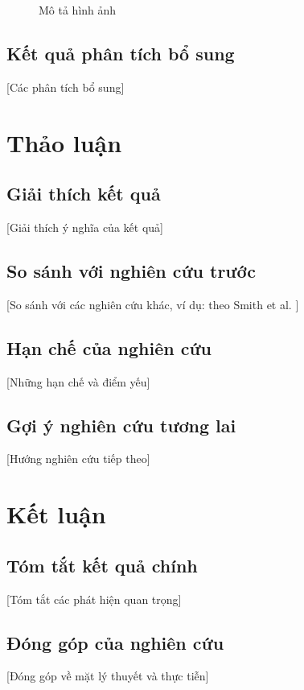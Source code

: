 \documentclass[12pt,a4paper]{article}
\begin{document}
\begin{figure}[h]
\centering
\caption{Mô tả hình ảnh}
\label{fig:example}
\end{figure}

\subsection{Kết quả phân tích bổ sung}
[Các phân tích bổ sung]

\section{Thảo luận}

\subsection{Giải thích kết quả}
[Giải thích ý nghĩa của kết quả]

\subsection{So sánh với nghiên cứu trước}
[So sánh với các nghiên cứu khác, ví dụ: theo Smith et al. \cite{smith2023}]

\subsection{Hạn chế của nghiên cứu}
[Những hạn chế và điểm yếu]

\subsection{Gợi ý nghiên cứu tương lai}
[Hướng nghiên cứu tiếp theo]

\section{Kết luận}

\subsection{Tóm tắt kết quả chính}
[Tóm tắt các phát hiện quan trọng]

\subsection{Đóng góp của nghiên cứu}
[Đóng góp về mặt lý thuyết và thực tiễn]
\end{document}
